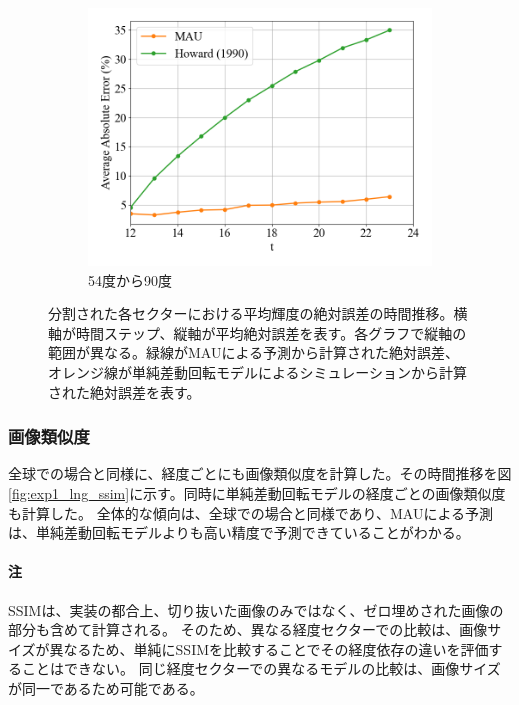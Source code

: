 \begin{figure}[htbp]
\begin{subfigure}{0.5\textwidth}
              \centering
              \includegraphics[width=\textwidth]{figures/exp1/lng_error_5.png}
              \caption{54度から90度}
              \label{fig:exp1_lng_error_5}
            \end{subfigure}
            \caption{分割された各セクターにおける平均輝度の絶対誤差の時間推移。横軸が時間ステップ、縦軸が平均絶対誤差を表す。各グラフで縦軸の範囲が異なる。緑線がMAUによる予測から計算された絶対誤差、オレンジ線が単純差動回転モデルによるシミュレーションから計算された絶対誤差を表す。}
            \label{fig:exp1_lng_error}
          \end{figure}
          
        \subsubsection{画像類似度}
          全球での場合と同様に、経度ごとにも画像類似度を計算した。その時間推移を図\ref{fig:exp1_lng_ssim}に示す。同時に単純差動回転モデルの経度ごとの画像類似度も計算した。
          全体的な傾向は、全球での場合と同様であり、MAUによる予測は、単純差動回転モデルよりも高い精度で予測できていることがわかる。
          \paragraph{注}
          SSIMは、実装の都合上、切り抜いた画像のみではなく、ゼロ埋めされた画像の部分も含めて計算される。
          そのため、異なる経度セクターでの比較は、画像サイズが異なるため、単純にSSIMを比較することでその経度依存の違いを評価することはできない。
          同じ経度セクターでの異なるモデルの比較は、画像サイズが同一であるため可能である。
          

